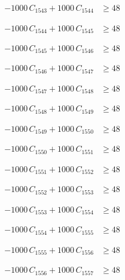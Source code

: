 \documentclass[a4paper,11pt]{article}
\begin{document}
\begin{align}
-1000\,C_{1543} + 1000\,C_{1544} &\geq 48 \nonumber
\end{align}

\begin{align}
-1000\,C_{1544} + 1000\,C_{1545} &\geq 48 \nonumber
\end{align}

\begin{align}
-1000\,C_{1545} + 1000\,C_{1546} &\geq 48 \nonumber
\end{align}

\begin{align}
-1000\,C_{1546} + 1000\,C_{1547} &\geq 48 \nonumber
\end{align}

\begin{align}
-1000\,C_{1547} + 1000\,C_{1548} &\geq 48 \nonumber
\end{align}

\begin{align}
-1000\,C_{1548} + 1000\,C_{1549} &\geq 48 \nonumber
\end{align}

\begin{align}
-1000\,C_{1549} + 1000\,C_{1550} &\geq 48 \nonumber
\end{align}

\begin{align}
-1000\,C_{1550} + 1000\,C_{1551} &\geq 48 \nonumber
\end{align}

\begin{align}
-1000\,C_{1551} + 1000\,C_{1552} &\geq 48 \nonumber
\end{align}

\begin{align}
-1000\,C_{1552} + 1000\,C_{1553} &\geq 48 \nonumber
\end{align}

\begin{align}
-1000\,C_{1553} + 1000\,C_{1554} &\geq 48 \nonumber
\end{align}

\begin{align}
-1000\,C_{1554} + 1000\,C_{1555} &\geq 48 \nonumber
\end{align}

\begin{align}
-1000\,C_{1555} + 1000\,C_{1556} &\geq 48 \nonumber
\end{align}

\begin{align}
-1000\,C_{1556} + 1000\,C_{1557} &\geq 48 \nonumber
\end{align}
\end{document}
